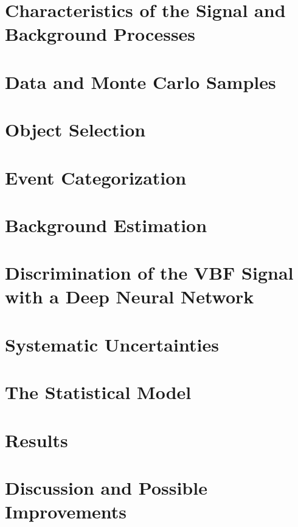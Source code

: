 \section{Characteristics of the Signal and Background Processes}
\label{sec:signal-bkg-characteristics}



\section{Data and Monte Carlo Samples}
\label{sec:data-mc-samples}



\section{Object Selection}
\label{sec:object-selection}



\section{Event Categorization}
\label{sec:event-categorization}



\section{Background Estimation}
\label{sec:bkg-estimation}


\section{Discrimination of the VBF Signal with a Deep Neural Network}
\label{sec:dnn}


\FloatBarrier
\section{Systematic Uncertainties}
\label{sec:systematics}



\section{The Statistical Model}
\label{sec:stats-analysis}


\FloatBarrier
\section{Results}
\label{sec:hww-results}


\FloatBarrier
\section{Discussion and Possible Improvements}
\label{sec:hww:summary}

